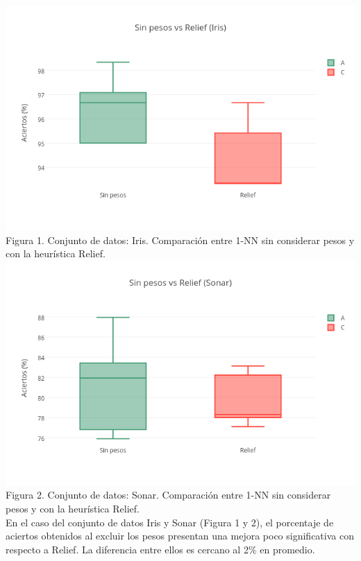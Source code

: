 \documentclass{ci5652}
\begin{document}
\includegraphics[width=\columnwidth]{no_weights-Relief_Iris}
{\small Figura 1. Conjunto de datos: Iris. Comparación entre 1-NN sin considerar
pesos y con la heurística Relief.}\\

\includegraphics[width=\columnwidth]{no_weights-Relief_Sonar}
{\small Figura 2. Conjunto de datos: Sonar. Comparación entre 1-NN sin
considerar pesos y con la heurística Relief.}\\

En el caso del conjunto de datos Iris y Sonar (Figura 1 y 2), el porcentaje de
aciertos obtenidos al excluir los pesos presentan una mejora poco significativa
con respecto a Relief. La diferencia entre ellos es cercano al 2\% en promedio.
\\
\end{document}
